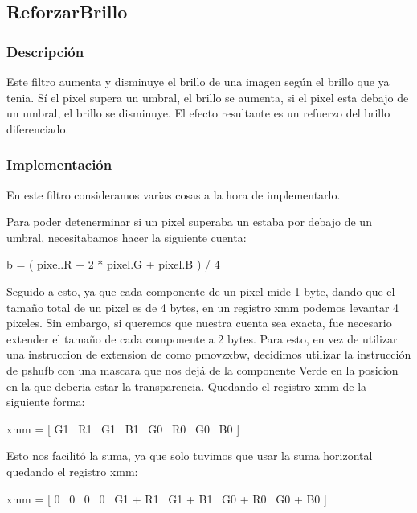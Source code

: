 \documentclass[a4paper]{article}
\begin{document}
\subsection{ReforzarBrillo}

\subsubsection{Descripción}

Este filtro aumenta y disminuye el brillo de una imagen según el brillo que ya tenia. Sí el
pixel supera un umbral, el brillo se aumenta, si el pixel esta debajo de un umbral, el brillo se
disminuye. El efecto resultante es un refuerzo del brillo diferenciado.

\subsubsection{Implementaci\'on}

En este filtro consideramos varias cosas a la hora de implementarlo.

Para poder detenerminar si un pixel superaba un estaba por debajo de un umbral, necesitabamos hacer la siguiente cuenta:

\begin{center}
	b = ( pixel.R + 2 * pixel.G + pixel.B ) / 4
\end{center}

Seguido a esto, ya que cada componente de un pixel mide 1 byte, dando que el tama\~no total de un pixel es de 4 bytes, en un registro xmm podemos levantar 4 pixeles. Sin embargo, si queremos que nuestra cuenta sea exacta, fue necesario extender el tama\~no de cada componente a 2 bytes. Para esto, en vez de utilizar una instruccion de extension de como pmovzxbw, decidimos utilizar la instrucción de pshufb con una mascara que nos dejá de la componente Verde en la posicion en la que deberia estar la transparencia. Quedando el registro xmm de la siguiente forma: 

\begin{center}
	xmm = [ G1 \textpipe\ R1 \textpipe\ G1 \textpipe\ B1 \textpipe\ G0 \textpipe\ R0 \textpipe\ G0 \textpipe\ B0 ]
\end{center}

Esto nos facilit\'o la suma, ya que solo tuvimos que usar la suma horizontal quedando el registro xmm:

\begin{center}
	xmm = [ 0 \textpipe\ 0 \textpipe\ 0 \textpipe\ 0 \textpipe\ G1 + R1 \textpipe\ G1 + B1 \textpipe\ G0 + R0 \textpipe\ G0 + B0 ]
\end{center}
\end{document}

